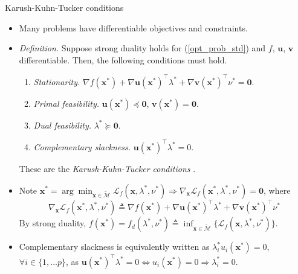 \documentclass{beamer}
\numberwithin{equation}{section}
\newcommand{\aref}[1]{\alert{\ref{#1}}}
\begin{document}
\begin{frame}{Karush-Kuhn-Tucker conditions}
    \begin{itemize}
        \item
        Many problems have differentiable objectives and constraints.

        \item
        \textit{Definition.} Suppose strong duality holds for
        (\aref{opt_prob_std}) and $ f $, $ \mathbf{u} $, $ \mathbf{v} $
        differentiable. Then, the following conditions must hold.
        \begin{enumerate}
            \item
            \textit{Stationarity.} $ \nabla f(\mathbf{x}^*) +
            \nabla\mathbf{u}(\mathbf{x}^*)^\top\lambda^* +
            \nabla\mathbf{v}(\mathbf{x}^*)^\top\nu^* = \mathbf{0} $.

            \item
            \textit{Primal feasibility.} $ \mathbf{u}(\mathbf{x}^*) \preceq
            \mathbf{0} $, $ \mathbf{v}(\mathbf{x}^*) = \mathbf{0} $.

            \item
            \textit{Dual feasibility.} $ \lambda^* \succeq \mathbf{0} $.

            \item
            \textit{Complementary slackness.} $ \mathbf{u}(\mathbf{x}^*)^\top
            \lambda^* = 0 $.
        \end{enumerate}
        These are the \textit{Karush-Kuhn-Tucker conditions}
        \cite{bv_convex_opt}.

        \item
        Note $ \mathbf{x}^* =
        \arg\min_{\mathbf{x} \in \tilde{\mathcal{M}}}
        \mathcal{L}_f(\mathbf{x}, \lambda^*, \nu^*) \Rightarrow
        \nabla_\mathbf{x}\mathcal{L}_f(\mathbf{x}^*, \lambda^*, \nu^*) =
        \mathbf{0} $, where
        \begin{equation*}
            \nabla_\mathbf{x}\mathcal{L}_f(\mathbf{x}^*, \lambda^*, \nu^*)
            \triangleq  \nabla f(\mathbf{x}^*) +
            \nabla\mathbf{u}(\mathbf{x}^*)^\top\lambda^* +
            \nabla\mathbf{v}(\mathbf{x}^*)^\top\nu^*
        \end{equation*}
        By strong duality, $ f(\mathbf{x}^*) = f_d(\lambda^*, \nu^*)
        \triangleq \inf_{\mathbf{x} \in \tilde{\mathcal{M}}}\{
            \mathcal{L}_f(\mathbf{x}, \lambda^*, \nu^*)
        \} $.

        \item
        Complementary slackness is equivalently written as
        $ \lambda_i^*u_i(\mathbf{x}^*) = 0 $,
        $ \forall i \in \{1, \ldots p\} $, as 
        $ \mathbf{u}(\mathbf{x}^*)^\top\lambda^* = 0 \Leftrightarrow
        u_i(\mathbf{x}^*) = 0 \Rightarrow \lambda_i^* = 0 $.
    \end{itemize}
\end{frame}
\end{document}
